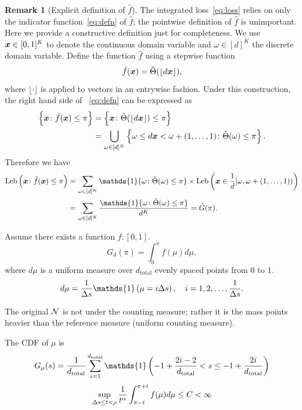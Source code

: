 \documentclass[10pt]{article}
\theoremstyle{definition}
\theoremstyle{definition}
\newtheorem{rmk}{Remark}
\theoremstyle{definition}
\begin{document}
\begin{enumerate}
\begin{rmk}[Explicit definition of $\hat f$]
The integrated loss~\eqref{eq:loss} relies on only the indicator function~\eqref{eq:defn} of $\hat f$; the pointwise definition of $\hat f$ is unimportant. Here we provide a constructive definition just for completeness. 
We use $\bm x\in[0,1]^K$ to denote the continuous domain variable and $\omega\in[d]^K$ the discrete domain variable. Define the function $\hat f$ using a stepwise function 
\[
\hat f (\bm x)=\hat \Theta(\lfloor d\bm x \rfloor),
\]
where $\lfloor\cdot\rfloor$ is applied to vectors in an entrywise fashion. Under this construction, the right hand side of ~\eqref{eq:defn} can be expressed as
\begin{align}
\left\{\bm x\colon \hat f(\bm x)\leq \pi\right\}&=\left\{ \bm x\colon \hat \Theta(\lfloor d \bm x \rfloor) \leq \pi \right\}\\
&=\bigcup_{\omega\in[d]^K}\left\{ \omega \leq d \bm x < \omega+(1,\ldots,1) \colon \hat \Theta(\omega)\leq \pi \right\}.
\end{align}
Therefore we have
\begin{align}
\text{Leb}\left(\mx\colon \hat f(\mx)\leq \pi\right) &= \sum_{\omega\in[d]^K} \mathds{1}\{\omega\colon \hat \Theta(\omega)\leq \pi\}\times \text{Leb}\left(\mx\in{1\over d}[\omega,\omega+(1,\ldots,1))\right)\\
&=\sum_{\omega\in[d]^K} {\mathds{1}\{\omega\colon \hat \Theta(\omega)\leq \pi\} \over d^K} = \hat G(\pi).
\end{align}
\end{rmk}

\newpage
Assume there exists a function $f\colon [0,1]$. 
\[
G_d(\pi)=\int_{0}^{\pi} f(\mu)d\mu,
\]
where $d\mu$ is a uniform measure over $d_{\text{total}}$ evenly spaced points from $0$ to $1$.  
\[
d\mu={1\over \Delta s}\mathds{1}\left( \mu =i\Delta s\right),\quad i=1,2,\ldots,{1\over \Delta s}.
\]

The original $\mathcal{N}$ is not under the counting measure; rather it is the mass points heavier than the reference measure (uniform counting measure). 






The CDF of $\mu$ is
\[
G_\mu(s)={1\over d_{\text{total}}} \sum_{i=1}^{d_{\text{total}}}\mathds{1}\left(-1+{2i-2\over d_{\text{total}}}<s\leq -1+{2i\over d_{\text{total}}}\right)
\]
\[
\sup_{\Delta s \leq t< \rho}{1\over t^\alpha}\int^{\pi+t}_{\pi-t}f(\mu)d\mu \leq C<\infty
\]



\end{enumerate}
\end{document}
